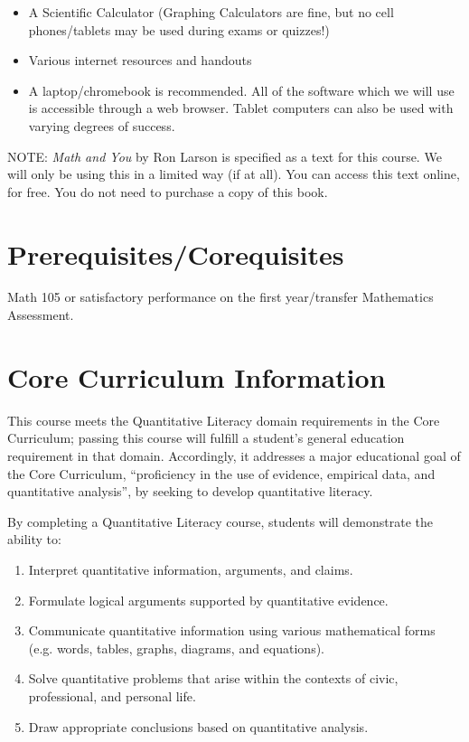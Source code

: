 \documentclass[11pt]{article}
\begin{document}
\begin{itemize}
\item A Scientific Calculator (Graphing Calculators are fine, but no cell phones/tablets may be used during exams or quizzes!)
\item Various internet resources and handouts
\item A laptop/chromebook is recommended.  All of the software which we will use is accessible through a web browser.  Tablet computers can also be used with varying degrees of success. 

\end{itemize}
NOTE: {\em Math and You} by Ron Larson is specified as a text for this course.  We will
only be using this in a limited way (if at all).  You can access this text online, for free. You do not need to purchase a copy of this book.


\section*{Prerequisites/Corequisites}
Math 105 or satisfactory performance on the first year/transfer
Mathematics Assessment.

\section*{Core Curriculum Information}

This course meets the Quantitative Literacy domain requirements in the Core Curriculum; passing this course will fulfill a student's general education requirement in that domain. Accordingly, it addresses a major educational goal of the Core Curriculum, ``proficiency in the use of evidence, empirical data, and quantitative analysis'', by seeking to develop quantitative literacy.

By completing a Quantitative Literacy course, students will demonstrate the ability to:
\begin{enumerate}
    \item Interpret quantitative information, arguments, and claims.

    \item Formulate logical arguments supported by quantitative evidence.

    \item Communicate quantitative information using various mathematical forms (e.g. words, tables, graphs, diagrams, and equations).

    \item Solve quantitative problems that arise within the contexts of civic, professional, and personal life.

    \item Draw appropriate conclusions based on quantitative analysis.
\end{enumerate}
\end{document}
